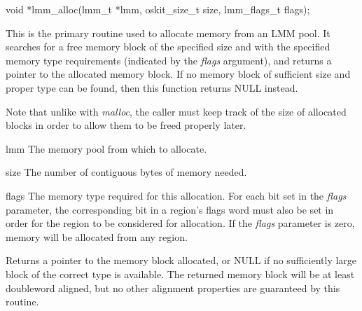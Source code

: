 \label{lmm-alloc}
\begin{apisyn}

	\funcproto void *lmm_alloc(lmm_t *lmm, oskit_size_t size,
				   lmm_flags_t flags);
\end{apisyn}
\begin{apidesc}
	This is the primary routine used to allocate memory from an LMM pool.
	It searches for a free memory block of the specified size
	and with the specified memory type requirements
	(indicated by the \emph{flags} argument),
	and returns a pointer to the allocated memory block.
	If no memory block of sufficient size and proper type can be found,
	then this function returns NULL instead.

	Note that unlike with \emph{malloc},
	the caller must keep track of the size of allocated blocks
	in order to allow them to be freed properly later.
\end{apidesc}
\begin{apiparm}
	\item[lmm]
		The memory pool from which to allocate.
	\item[size]
		The number of contiguous bytes of memory needed.
	\item[flags]
		The memory type required for this allocation.
		For each bit set in the \emph{flags} parameter,
		the corresponding bit in a region's flags word must also be set
		in order for the region to be considered for allocation.
		If the \emph{flags} parameter is zero,
		memory will be allocated from any region.
\end{apiparm}
\begin{apiret}
	Returns a pointer to the memory block allocated,
	or NULL if no sufficiently large block of the correct type is available.
	The returned memory block will be at least doubleword aligned,
	but no other alignment properties are guaranteed by this routine.
\end{apiret}

